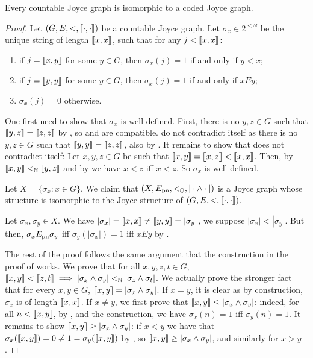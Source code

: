 \begin{theorem}[$\RCA_0$]\label{thm:joyce-graph-to-coded}
  Every countable Joyce graph is isomorphic to a coded Joyce graph.
\end{theorem}
\begin{proof}
  Let $(G, E, <, \llbracket \cdot , \cdot \rrbracket)$ be a countable Joyce graph.
  Let $\sigma_x \in 2^{<\omega}$ be the unique string of length $\llbracket x , x \rrbracket$, such that for any $j < \llbracket x , x \rrbracket$:
  \begin{enumerate}
  \item\label{it:jctc1} if $j=\llbracket x , y \rrbracket$ for some $y\in G$, then $\sigma_x(j) = 1$ if and only if $y<x$;
  \item\label{it:jctc2} if $j=\llbracket y , y \rrbracket$ for some $y\in G$, then $\sigma_x(j) = 1$ if and only if $xEy$;
  \item\label{it:jctc3} $\sigma_x(j)=0$ otherwise.
  \end{enumerate}
  One first need to show that $\sigma_x$ is well-defined. First, there is no $y,z\in G$ such that $\llbracket y , z \rrbracket = \llbracket z , z \rrbracket$ by , so  and  are compatible.  do not contradict itself as there is no $y,z\in G$ such that $\llbracket y , y \rrbracket=\llbracket z , z \rrbracket$, also by . It remains to show that  does not contradict itself: Let $x,y,z\in G$ be such that $\llbracket x , y \rrbracket = \llbracket x , z \rrbracket<\llbracket x , x \rrbracket$. Then, by  $\llbracket x , y \rrbracket<_{\mathbb{N}}\llbracket y , z \rrbracket$ and by  we have $x<z$ iff $x<z$. So $\sigma_x$ is well-defined.
  
Let $X = \{ \sigma_x: x \in G \}$.
We claim that $(X, E_{\mathrm{pn}}, <_{\mathbb{Q}}, |\cdot \wedge \cdot|)$ is a Joyce graph whose structure is isomorphic to the Joyce structure of $(G, E, <, \llbracket \cdot , \cdot \rrbracket)$.

Let $\sigma_x, \sigma_y\in X$. We have $|\sigma_x|=\llbracket x , x \rrbracket\neq \llbracket y , y \rrbracket=|\sigma_y|$, we suppose $|\sigma_x|<|\sigma_y|$. But then, $\sigma_xE_{\mathrm{pn}}\sigma_y$ iff $\sigma_y(|\sigma_x|)=1$ iff $xEy$ by .

The rest of the proof follows the same argument that the construction in the proof of  works. 
We prove that for all $x,y,z,t\in G$, $\llbracket x , y \rrbracket<\llbracket z , t \rrbracket\implies |\sigma_x\wedge \sigma_y|<_{\mathbb{N}}|\sigma_z\wedge \sigma_t|$. We actually prove the stronger fact that for every $x,y\in G$, $\llbracket x , y \rrbracket = |\sigma_x\wedge\sigma_y|$. If $x=y$, it is clear as by construction, $\sigma_x$ is of length $\llbracket x , x \rrbracket$. If $x\neq y$, we first prove that $\llbracket x , y \rrbracket \leq |\sigma_x\wedge\sigma_y|$: indeed, for all $n<\llbracket x , y \rrbracket$, by ,  and the construction, we have $\sigma_x(n)=1$ iff $\sigma_y(n)=1$. It remains to show $\llbracket x , y \rrbracket \geq |\sigma_x\wedge\sigma_y|$: if $x<y$ we have that $\sigma_x(\llbracket x , y \rrbracket)=0\neq 1=\sigma_y(\llbracket x , y \rrbracket)$ by , so $\llbracket x , y \rrbracket \geq |\sigma_x\wedge\sigma_y|$, and similarly for $x>y$.


\end{proof}
